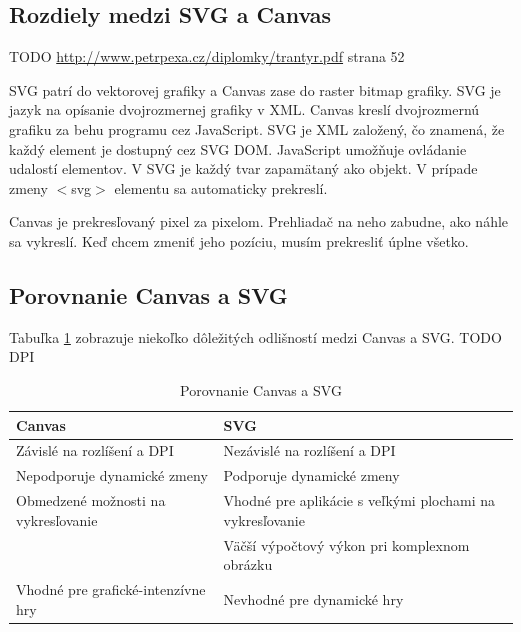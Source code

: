  \subsection{Rozdiely medzi SVG a Canvas}
TODO \url{http://www.petrpexa.cz/diplomky/trantyr.pdf} strana 52

SVG patrí do vektorovej grafiky a Canvas zase do raster bitmap grafiky. 
 SVG je jazyk na opísanie dvojrozmernej grafiky v XML.  Canvas kreslí dvojrozmernú grafiku za behu programu cez JavaScript.  SVG je XML založený, čo znamená, že každý element je dostupný cez SVG DOM.   JavaScript umožňuje ovládanie udalostí elementov. V SVG je každý tvar zapamätaný ako objekt.  V prípade zmeny $<$svg$>$ elementu sa automaticky prekreslí.  
 
 
 Canvas je prekresľovaný pixel za pixelom. Prehliadač na neho zabudne, ako náhle sa vykreslí. Keď chcem zmeniť jeho pozíciu, musím prekresliť úplne všetko. 
 
 
 
 
 \subsection{Porovnanie Canvas a SVG}
 Tabuľka \ref{canvas:SVG} zobrazuje niekoľko dôležitých odlišností medzi Canvas a SVG. 
 TODO DPI
 \begin{table}[hp]
 \centering
 \begin{tabular}{|l|p{7.5cm} |}
 	\hline \textbf{Canvas} & \textbf{SVG} \\
 	 	\hline Závislé na rozlíšení a \acs{DPI} & Nezávislé na rozlíšení a DPI \\ 
 	\hline Nepodporuje dynamické zmeny & Podporuje dynamické zmeny \\ 
 	\hline Obmedzené možnosti na vykresľovanie  & Vhodné pre aplikácie s veľkými plochami na vykresľovanie \\ 
 	\hline & Väčší výpočtový výkon pri komplexnom obrázku \\ 
 	\hline Vhodné pre grafické-intenzívne hry & Nevhodné pre dynamické hry \\ 
 	\hline 
 \end{tabular} 

 \caption{Porovnanie Canvas a SVG}
 \label{canvas:SVG}
 
\end{table}
 
